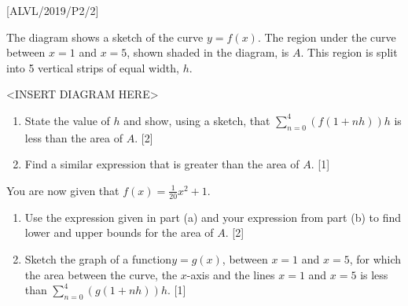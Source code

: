 \item {[}ALVL/2019/P2/2{]} 

The diagram shows a sketch of the curve $y=f\left(x\right)$. The
region under the curve between $x=1$ and $x=5$, shown shaded in
the diagram, is $A$. This region is split into 5 vertical strips
of equal width, $h$.
\noindent \begin{center}
\textless INSERT DIAGRAM HERE\textgreater{}
\par\end{center}
\begin{enumerate}
\item State the value of $h$ and show, using a sketch, that $\sum_{n=0}^{4}\left(f\left(1+nh\right)\right)h$
is less than the area of $A$. \hfill{}{[}2{]}
\item Find a similar expression that is greater than the area of $A$. \hfill{}{[}1{]}
\end{enumerate}
You are now given that $f\left(x\right)=\frac{1}{20}x^{2}+1$.
\begin{enumerate}
\item Use the expression given in part (a) and your expression from part
(b) to find lower and upper bounds for the area of $A$. \hfill{}{[}2{]}
\item Sketch the graph of a function$y=g\left(x\right)$, between $x=1$
and $x=5$, for which the area between the curve, the $x$-axis and
the lines $x=1$ and $x=5$ is less than $\sum_{n=0}^{4}\left(g\left(1+nh\right)\right)h$.
\hfill{}{[}1{]}
\end{enumerate}
